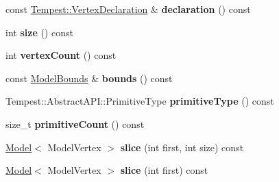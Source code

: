 \begin{DoxyCompactItemize}
\item 
\hypertarget{class_tempest_1_1_model_a2980dc670aed2e64cb1493c95b2958e6}{const \hyperlink{class_tempest_1_1_vertex_declaration}{Tempest\+::\+Vertex\+Declaration} \& {\bfseries declaration} () const }\label{class_tempest_1_1_model_a2980dc670aed2e64cb1493c95b2958e6}

\item 
\hypertarget{class_tempest_1_1_model_a139aadbec813ec242926cfd0cd767768}{int {\bfseries size} () const }\label{class_tempest_1_1_model_a139aadbec813ec242926cfd0cd767768}

\item 
\hypertarget{class_tempest_1_1_model_a9f605fc6893bf1dc1732267708d49062}{int {\bfseries vertex\+Count} () const }\label{class_tempest_1_1_model_a9f605fc6893bf1dc1732267708d49062}

\item 
\hypertarget{class_tempest_1_1_model_afc0b71b9ccaddf52f10b50ee5a1a28ce}{const \hyperlink{struct_tempest_1_1_model_bounds}{Model\+Bounds} \& {\bfseries bounds} () const }\label{class_tempest_1_1_model_afc0b71b9ccaddf52f10b50ee5a1a28ce}

\item 
\hypertarget{class_tempest_1_1_model_a3cb339eeb2172693b62b97f18aadfd56}{Tempest\+::\+Abstract\+A\+P\+I\+::\+Primitive\+Type {\bfseries primitive\+Type} () const }\label{class_tempest_1_1_model_a3cb339eeb2172693b62b97f18aadfd56}

\item 
\hypertarget{class_tempest_1_1_model_a696b7ee7bbb3a8d3ca948234608f1eb7}{size\+\_\+t {\bfseries primitive\+Count} () const }\label{class_tempest_1_1_model_a696b7ee7bbb3a8d3ca948234608f1eb7}

\item 
\hypertarget{class_tempest_1_1_model_a2f38ca7e86fb29d1f1369f6b747e26e4}{\hyperlink{class_tempest_1_1_model}{Model}$<$ Model\+Vertex $>$ {\bfseries slice} (int first, int size) const }\label{class_tempest_1_1_model_a2f38ca7e86fb29d1f1369f6b747e26e4}

\item 
\hypertarget{class_tempest_1_1_model_a6c870dd7ec9cf0a7450a84b049c397ca}{\hyperlink{class_tempest_1_1_model}{Model}$<$ Model\+Vertex $>$ {\bfseries slice} (int first) const }\label{class_tempest_1_1_model_a6c870dd7ec9cf0a7450a84b049c397ca}

\end{DoxyCompactItemize}
